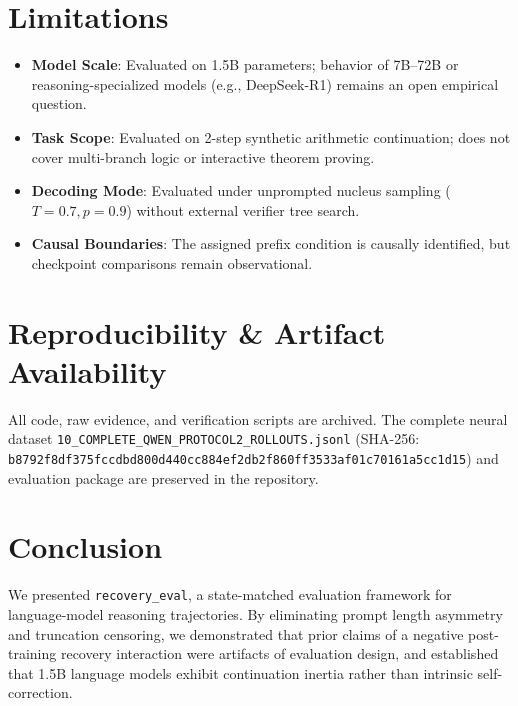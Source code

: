 \documentclass[10pt,conference]{IEEEtran}
\begin{document}
\section{Limitations}
\begin{itemize}
    \item \textbf{Model Scale}: Evaluated on 1.5B parameters; behavior of 7B--72B or reasoning-specialized models (e.g., DeepSeek-R1) remains an open empirical question.
    \item \textbf{Task Scope}: Evaluated on 2-step synthetic arithmetic continuation; does not cover multi-branch logic or interactive theorem proving.
    \item \textbf{Decoding Mode}: Evaluated under unprompted nucleus sampling ($T=0.7, p=0.9$) without external verifier tree search.
    \item \textbf{Causal Boundaries}: The assigned prefix condition is causally identified, but checkpoint comparisons remain observational.
\end{itemize}

\section{Reproducibility \& Artifact Availability}
All code, raw evidence, and verification scripts are archived. The complete neural dataset \texttt{10\_COMPLETE\_QWEN\_PROTOCOL2\_ROLLOUTS.jsonl} (SHA-256: \texttt{b8792f8df375fccdbd800d440cc884ef\allowbreak 2db2f860ff3533af01c70161a5cc1d15}) and evaluation package are preserved in the repository.

\section{Conclusion}
We presented \texttt{recovery\_eval}, a state-matched evaluation framework for language-model reasoning trajectories. By eliminating prompt length asymmetry and truncation censoring, we demonstrated that prior claims of a negative post-training recovery interaction were artifacts of evaluation design, and established that 1.5B language models exhibit continuation inertia rather than intrinsic self-correction.



\end{document}
